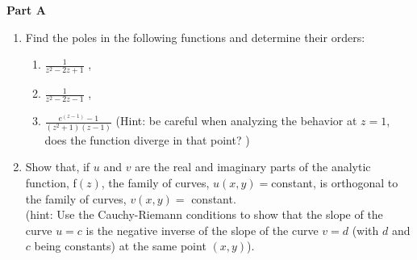 \documentclass[fleqn]{article}
\begin{document}
  \textbf{Part A}
  \begin{enumerate}

    \item Find the poles in the following functions and determine their orders:
      \begin{enumerate}
        \item  $\frac{1}{z^2 - 2z + 1}$ , 
        \item  $\frac{1}{z^2 - 2z - 1}$ , 
        \item  $\frac{e^{(z-1)} - 1}{(z^2 + 1) (z - 1)}$  (Hint: be careful when analyzing the behavior at $z=1$, does the function diverge in that point? )
      \end{enumerate}

    \item Show that, if $u$ and $v$ are the real and imaginary parts of the analytic function, f$ (z)$,
    the family of curves, $u(x, y) = $constant, is orthogonal to the family of curves, $v(x, y) =$ constant.\\
    (hint: Use the Cauchy-Riemann conditions to show that the slope of the curve $u = c$ is the negative inverse of the slope of the curve $v = d$ (with $d$ and $c$ being constants) at the same point $(x, y)$). 


\end{enumerate}
\end{document}
